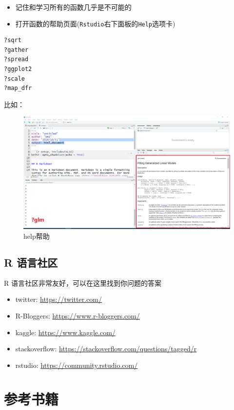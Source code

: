 \documentclass[
]{book}
\providecommand{\tightlist}{%
  \setlength{\itemsep}{0pt}\setlength{\parskip}{0pt}}
\begin{document}
\begin{itemize}
\tightlist
\item
  记住和学习所有的函数几乎是不可能的
\item
  打开函数的帮助页面(\texttt{Rstudio}右下面板的\texttt{Help}选项卡)
\end{itemize}

\begin{verbatim}
?sqrt
?gather
?spread
?ggplot2
?scale
?map_dfr
\end{verbatim}

比如：

\begin{figure}
\centering
\includegraphics{figure/20.png}
\caption{help帮助}
\end{figure}

\hypertarget{r-ux8bedux8a00ux793eux533a}{%
\section*{R 语言社区}\label{r-ux8bedux8a00ux793eux533a}}

R 语言社区非常友好，可以在这里找到你问题的答案

\begin{itemize}
\tightlist
\item
  twitter: \url{https://twitter.com/}
\item
  R-Bloggers: \url{https://www.r-bloggers.com/}
\item
  kaggle: \url{https://www.kaggle.com/}
\item
  stackoverflow: \url{https://stackoverflow.com/questions/tagged/r}
\item
  rstudio: \url{https://community.rstudio.com/}
\end{itemize}

\hypertarget{reference}{%
\chapter{参考书籍}\label{reference}}
\end{document}
